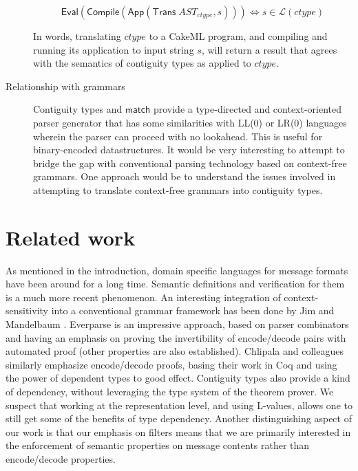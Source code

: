 \documentclass[a4paper,UKenglish,cleveref, autoref, thm-restate]{lipics-v2021}
\newcommand{\konst}[1]{\ensuremath{\mathsf{#1}}}
\newcommand{\Lang}[1]{\ensuremath{{\mathcal L}({#1})}}
\begin{document}
\begin{description}
\[
 \konst{Eval}(\konst{Compile} (\konst{App}(\konst{Trans}\; \mathit{AST}_\mathit{ctype},s))) \iff s \in \Lang{\mathit{ctype}}
\]

  In words, translating $\mathit{ctype}$ to a CakeML program, and
  compiling and running its application to input string $s$, will
  return a result that agrees with the semantics of contiguity types
  as applied to $\mathit{ctype}$.

\item [Relationship with grammars]

Contiguity types and \konst{match} provide a type-directed and
context-oriented parser generator that has some similarities with
LL(0) or LR(0) languages wherein the parser can proceed with no
lookahead. This is useful for binary-encoded datastructures. It would
be very interesting to attempt to bridge the gap with conventional
parsing technology based on context-free grammars. One approach would
be to understand the issues involved in attempting to translate
context-free grammars into contiguity types.

\end{description}

\section {Related work}

As mentioned in the introduction, domain specific languages for
message formats have been around for a long time. Semantic definitions
and verification for them is a much more recent phenomenon. An
interesting integration of context-sensitivity into a conventional
grammar framework has been done by Jim and Mandelbaum
\cite{trevor-jim-dependent-parsing}. Everparse \cite{everparse} is an
impressive approach, based on parser combinators and having an
emphasis on proving the invertibility of encode/decode pairs with
automated proof (other properties are also established). Chlipala and
colleagues \cite{narcissus-encode-decode} similarly emphasize
encode/decode proofs, basing their work in Coq and using the power of
dependent types to good effect. Contiguity types also provide a kind
of dependency, without leveraging the type system of the theorem
prover. We suspect that working at the representation level, and using
L-values, allows one to still get some of the benefits of type
dependency. Another distinguishing aspect of our work is that our
emphasis on filters means that we are primarily interested in the
enforcement of semantic properties on message contents rather than
encode/decode properties.
\end{document}
